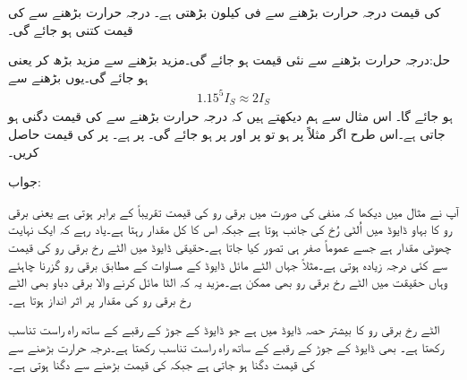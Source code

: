  کی قیمت درجہ حرارت بڑھنے سے   فی کیلون بڑھتی ہے۔ درجہ حرارت بڑھنے سے  کی قیمت کتنی ہو جائے گی۔

حل:درجہ حرارت  بڑھنے سے نئی قیمت  ہو جائے گی۔مزید  بڑھنے سے   مزید  بڑھ کر  یعنی  ہو جائے گی۔یوں  بڑھنے سے
\begin{align*}
1.15^5 I_S \approx 2 I_S
\end{align*} 
ہو جائے گا۔
اس مثال سے ہم دیکھتے ہیں کہ درجہ حرارت  بڑھنے سے  کی قیمت دگنی ہو جاتی ہے۔اس طرح اگر مثلاً  پر  ہو تو  پر  اور  پر  ہو جائے گی۔
 پر   ہے۔  پر  کی قیمت حاصل کریں۔

جواب:

آپ نے مثال  میں دیکھا کہ منفی  کی صورت میں برقی رو کی قیمت   تقریباً  کے برابر ہوتی ہے یعنی برقی رو کا بہاو ڈایوڈ میں اُلٹی رُخ کی جانب ہوتا ہے جبکہ اس کا کل مقدار  رہتا ہے۔یاد رہے کہ  ایک نہایت چھوٹی مقدار ہے جسے عموماً صفر ہی تصور کیا جاتا ہے۔حقیقی ڈایوڈ میں الٹے رخ برقی رو کی قیمت   سے کئی درجہ زیادہ ہوتی ہے۔مثلاً جہاں الٹے مائل ڈایوڈ کے مساوات کے مطابق  برقی رو گزرنا چاہئے وہاں حقیقت میں الٹے رخ  برقی رو بھی ممکن ہے۔مزید یہ کہ الٹا مائل کرنے والا برقی دباو بھی الٹے رخ برقی رو کی مقدار  پر اثر انداز ہوتا ہے۔

الٹے رخ برقی رو کا بیشتر حصہ ڈایوڈ میں   ہے جو ڈایوڈ کے  جوڑ کے رقبے کے ساتھ راہ راست تناسب رکھتا ہے۔ بھی ڈایوڈ کے  جوڑ کے رقبے کے ساتھ راہ راست تناسب رکھتا  ہے۔درجہ حرارت  بڑھنے سے کی قیمت دگنا ہو جاتی ہے جبکہ   کی قیمت   بڑھنے سے دگنا ہوتی ہے۔


